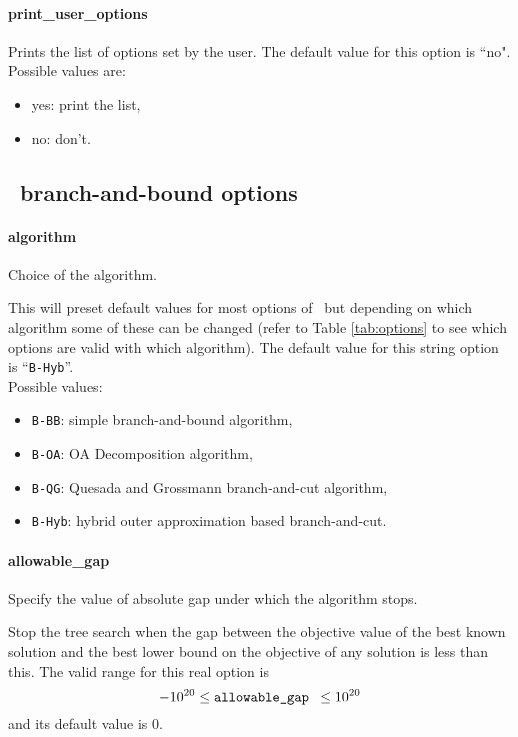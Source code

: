 \paragraph{print\_user\_options} Prints the list of options set by the user.
The default value for this option is ``no".\\
Possible values are:
\begin{itemize}
\item yes: print the list,
\item no: don't.
\end{itemize}

\subsection{\Bonmin\ branch-and-bound options}

\paragraph{algorithm} Choice of the algorithm.

       This will preset default values for most options
    of \Bonmin\ but depending on which algorithm some
of these can be changed (refer to Table \ref{tab:options} to see which options
           are valid with which algorithm).
    The default value for this string option is ``{\tt B-Hyb}''.
\\
Possible values:
\begin{itemize}
   \item {\tt B-BB}: simple branch-and-bound algorithm,
   \item {\tt B-OA}: OA Decomposition algorithm,
   \item {\tt B-QG}: Quesada and Grossmann branch-and-cut algorithm,
   \item {\tt B-Hyb}: hybrid outer approximation based branch-and-cut.
\end{itemize}


\paragraph{allowable\_gap}
Specify the value of absolute gap under which the algorithm stops.

 Stop the tree search when the gap between the
objective value of the best known solution and
the best lower bound on the objective of any solution
is less than this. The valid range for this real option is
$$-10^{20} \le \hbox{\tt allowable\_gap } \le 10^{20}$$
and its default value is $0$.


